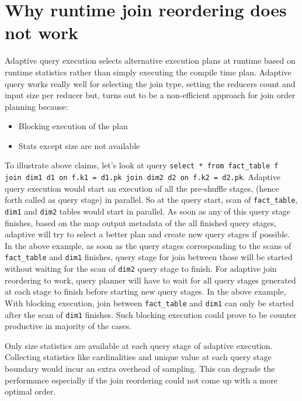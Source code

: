 \section{Why runtime join reordering does not work}
Adaptive query execution selects alternative execution plans at runtime based on runtime statistics rather than simply executing the compile time plan. Adaptive query works really well for selecting the join type, setting the reducers count and input size per reducer but, turns out to be a non-efficient approach for join order planning because:
\begin{itemize}
    \item Blocking execution of the plan
    \item Stats except size are not available
\end{itemize}

To illustrate above claims, let's look at query \texttt{select * from fact\_table f join dim1 d1 on f.k1 = d1.pk join dim2 d2 on f.k2 = d2.pk}. Adaptive query execution would start an execution of all the pre-shuffle stages, (hence forth called as query stage) in parallel. So at the query start, scan of \texttt{fact\_table}, \texttt{dim1}  and \texttt{dim2} tables would start in parallel. As soon as any of this query stage finishes, based on the map output metadata of the all finished query stages, adaptive will try to select a better plan and create new query stages if possible. In the above example, as soon as the query stages corresponding to the scans of \texttt{fact\_table} and \texttt{dim1} finishes, query stage for join between those will be started without waiting for the scan of \texttt{dim2} query stage to finish. For adaptive join reordering to work, query planner will have to wait for all query stages generated at each stage to finish before starting new query stages. In the above example, With blocking execution, join between \texttt{fact\_table} and \texttt{dim1} can only be started after the scan of \texttt{dim1} finishes. Such blocking execution could prove to be counter productive in majority of the cases.

Only size statistics are available at each query stage of adaptive execution. Collecting statistics like cardinalities and unique value at each query stage boundary would incur an extra overhead of sampling. This can degrade the performance especially if the join reordering could not come up with a more optimal order.
